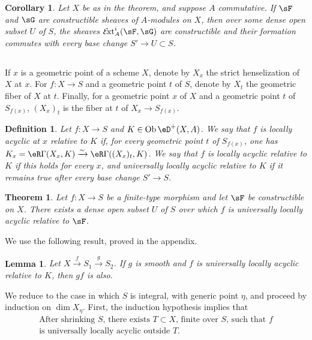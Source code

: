 \documentclass[12pt,oneside,english]{smfbook}
\DeclareMathOperator{\Ext}{\mathcal{E}\!xt} %
\DeclareMathOperator{\ob}{Ob}
\newcommand{\iso}{\xrightarrow\sim}
\newtheorem{lemma_}[subsection]{Lemma}
\newtheorem{corollary_}[subsection]{Corollary}
\newtheorem{theorem_}[subsection]{Theorem}
\newtheorem{definition_}[subsection]{Definition}
\begin{document}
\begin{corollary_}\label{VII:2-10}
Let $X$ be as in the theorem, and suppose $A$ commutative. If $\sF$ and $\sG$ are constructible sheaves of $A$-modules on $X$, then over some dense open subset $U$ of $S$, the sheaves $\Ext_A^i(\sF,\sG)$ are constructible and their formation commutes with every base change $S'\to U\subset S$.
\end{corollary_}

\subsection{}\label{VII:2-11}

If $x$ is a geometric point of a scheme $X$, denote by $X_x$ the strict henselization of $X$ at $x$. For $f:X\to S$ and a geometric point $t$ of $S$, denote by $X_t$ the geometric fiber of $X$ at $t$. Finally, for a geometric point $x$ of $X$ and a geometric point $t$ of $S_{f(x)}$, $(X_x)_t$ is the fiber at $t$ of $X_x\to S_{f(x)}$.

\begin{definition_}\label{VII:2-12}
Let $f:X\to S$ and $K\in\ob\eD^+(X,A)$. We say that $f$ is \emph{locally acyclic at $x$ relative to $K$} if, for every geometric point $t$ of $S_{f(x)}$, one has $K_x=\eR\Gamma(X_x,K)\iso\eR\Gamma((X_x)_t,K)$. We say that $f$ is \emph{locally acyclic relative to $K$} if this holds for every $x$, and \emph{universally locally acyclic relative to $K$} if it remains true after every base change $S'\to S$.
\end{definition_}

\begin{theorem_}\label{VII:2-13}
Let $f:X\to S$ be a finite-type morphism and let $\sF$ be constructible on $X$. There exists a dense open subset $U$ of $S$ over which $f$ is universally locally acyclic relative to $\sF$.
\end{theorem_}

We use the following result, proved in the appendix.

\begin{lemma_}\label{VII:2-14}
Let $X\xrightarrow{f}S_1\xrightarrow{g}S_2$. If $g$ is smooth and $f$ is universally locally acyclic relative to $K$, then $gf$ is also.
\end{lemma_}

We reduce to the case in which $S$ is integral, with generic point $\eta$, and proceed by induction on $\dim X_\eta$. First, the induction hypothesis implies that
\begin{equation*}\tag{A}\label{VII:eq:2-14-1}
  \begin{array}{c}
    \text{After shrinking $S$, there exists $T\subset X$, finite over
    $S$, such that $f$}\\
    \text{is universally locally acyclic outside $T$.}
  \end{array}
\end{equation*}
\end{document}
